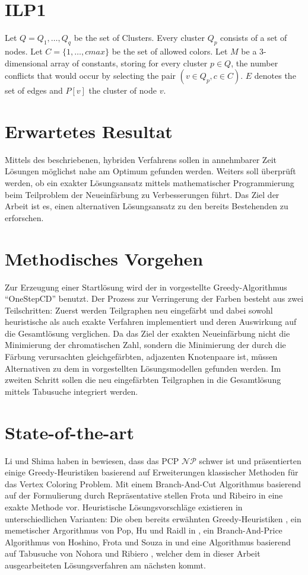\documentclass{article}
\begin{document}
\section{ILP1}
Let $Q = {Q_1,\ldots,Q_q}$ be the set of Clusters. Every cluster $Q_p$ consists of a set of nodes. Let $C=\{1,\ldots,cmax\}$ be the
set of allowed colors. Let $M$ be a 3-dimensional array of constants, storing
for every cluster $p \in Q$, the number conflicts that would occur by selecting the pair $(v \in Q_p, c \in C)$.
$E$ denotes the set of edges and $P[v]$ the cluster of node $v$.


\section{Erwartetes Resultat}

Mittels des beschriebenen, hybriden Verfahrens sollen in annehmbarer Zeit Lösun\-gen möglichst nahe am Optimum gefunden werden. Weiters soll überprüft werden, ob ein exakter Lösungsansatz mittels mathematischer Programmierung beim Teilproblem der Neueinfärbung zu Verbesserungen führt. Das Ziel der Arbeit ist es, einen alternativen Lösungsansatz zu den bereits Bestehenden zu erforschen.


\section{Methodisches Vorgehen}

Zur Erzeugung einer Startlösung wird der in \cite{li-00} vorgestellte Greedy-Algorithmus ``OneStepCD'' benutzt. Der Prozess zur Verringerung der Farben besteht aus zwei Teilschritten: Zuerst werden Teilgraphen neu eingefärbt und dabei sowohl heuristische als auch exakte Verfahren implementiert und deren Auswirkung auf die Gesamtlösung verglichen. Da das Ziel der exakten Neueinfärbung nicht die Minimierung der chromatischen Zahl, sondern die Minimierung der durch die Färbung verursachten gleichgefärbten, adjazenten Knotenpaare ist, müssen Alternativen zu dem in \cite{frota-07} vorgestellten Lösungsmodellen gefunden werden. Im zweiten Schritt sollen die neu eingefärbten Teilgraphen in die Gesamtlösung mittels Tabusuche integriert werden.


\section{State-of-the-art}

Li und Shima haben in \cite{li-00} bewiesen, dass das PCP $\mathcal{NP}$ schwer ist und präsentier\-ten einige Greedy-Heuristiken basierend auf Erweiterungen klassischer Methoden für das Vertex Coloring Problem. Mit einem Branch-And-Cut Algorithmus basierend auf der Formulierung durch Repräsentative stellen Frota und Ribeiro in \cite{frota-07} eine exakte Methode vor. Heuristische Lösungsvorschläge existieren in unterschiedlichen Varianten: Die oben bereits erwähnten Greedy-Heuristiken \cite{li-00}, ein memetischer Argorithmus von Pop, Hu und Raidl in \cite{pop-13}, ein Branch-And-Price Algorithmus von Hoshino, Frota und Souza in \cite{hoshino-11} und eine Algorithmus basierend auf Tabusuche von Nohora und Ribiero \cite{noronha-06}, welcher dem in dieser Arbeit ausgearbeiteten Lösungsverfahren am nächsten kommt.
 
\end{document}
